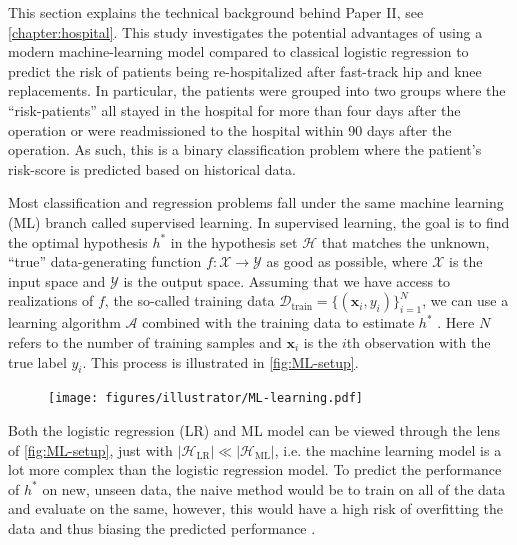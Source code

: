 
This section explains the technical background behind Paper II, see \autoref{chapter:hospital}. This study investigates the potential advantages of using a modern machine-learning model compared to classical logistic regression to predict the risk of patients being re-hospitalized after fast-track hip and knee replacements. In particular, the patients were grouped into two groups where the ``risk-patients'' all stayed in the hospital for more than four days after the operation or were readmissioned to the hospital within 90 days after the operation. As such, this is a binary classification problem where the patient's risk-score is predicted based on historical data.

Most classification and regression problems fall under the same machine learning (ML) branch called supervised learning. In supervised learning, the goal is to find the optimal hypothesis $h^*$ in the hypothesis set $\mathcal{H}$ that matches the unknown, ``true'' data-generating function $f: \mathcal{X} \rightarrow \mathcal{Y}$ as good as possible, where $\mathcal{X}$ is the input space and $\mathcal{Y}$ is the output space. Assuming that we have access to realizations of $f$, the so-called training data $\mathcal{D}_\mathrm{train} = \{(\mathbf{x}_i, y_i)\}_{i=1}^N$, we can use a learning algorithm $\mathcal{A}$ combined with the training data to estimate $h^*$ \autocite{abu-mostafaLearningData2012a}. Here $N$ refers to the number of training samples and $\mathbf{x}_i$ is the $i$th observation with the true label $y_i$. This process is illustrated in \autoref{fig:ML-setup}.

\begin{figure}[htbp]
    \centering
    \texttt{[image: figures/illustrator/ML-learning.pdf]}
\end{figure}

Both the logistic regression (LR) and ML model can be viewed through the lens of \autoref{fig:ML-setup}, just with $|\mathcal{H}_\mathrm{LR}| \ll |\mathcal{H}_\mathrm{ML}|$, i.e. the machine learning model is a lot more complex than the logistic regression model. To predict the performance of $h^*$ on new, unseen data, the naive method would be to train on all of the data and evaluate on the same, however, this would have a high risk of overfitting the data and thus biasing the predicted performance \autocite{abu-mostafaLearningData2012a}.

